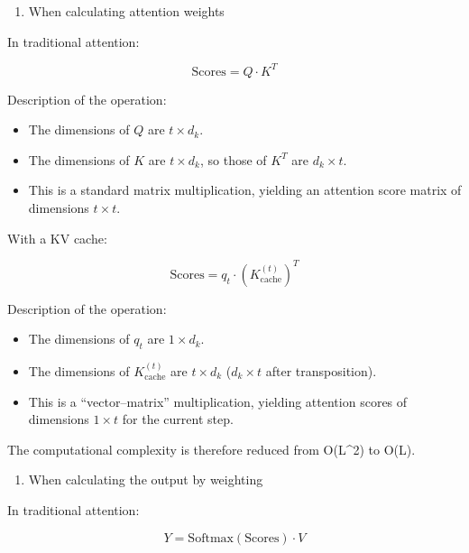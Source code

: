 \begin{enumerate}
\def\labelenumi{\arabic{enumi}.}
\setcounter{enumi}{1}
\tightlist
\item
  When calculating attention weights
\end{enumerate}

In traditional attention:

\[
\mathrm{Scores} = Q \cdot K^T
\]

Description of the operation:

\begin{itemize}
\tightlist
\item
  The dimensions of \(Q\) are \(t \times d_k\).
\item
  The dimensions of \(K\) are \(t \times d_k\), so those of \(K^T\) are \(d_k \times t\).
\item
  This is a standard matrix multiplication, yielding an attention score matrix of dimensions \(t \times t\).
\end{itemize}

With a KV cache:

\[
\mathrm{Scores} = q_t \cdot (K_{\mathrm{cache}}^{(t)})^T
\]

Description of the operation:

\begin{itemize}
\tightlist
\item
  The dimensions of \(q_t\) are \(1 \times d_k\).
\item
  The dimensions of \(K_{\mathrm{cache}}^{(t)}\) are \(t \times d_k\) (\(d_k \times t\) after transposition).
\item
  This is a ``vector--matrix'' multiplication, yielding attention scores of dimensions \(1 \times t\) for the current step.
\end{itemize}

The computational complexity is therefore reduced from O(L\^{}2) to O(L).

\begin{enumerate}
\def\labelenumi{\arabic{enumi}.}
\setcounter{enumi}{2}
\tightlist
\item
  When calculating the output by weighting
\end{enumerate}

In traditional attention:

\[
Y = \mathrm{Softmax}(\mathrm{Scores}) \cdot V
\]

